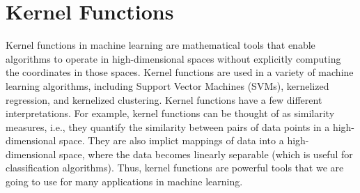 \documentclass{article}[11pt]
\newcommand{\norm}[1]{\left|\left|#1\right|\right|}
\begin{document}

\section{Kernel Functions}
Kernel functions in machine learning are mathematical tools that enable algorithms to operate in high-dimensional spaces without explicitly computing the coordinates in those spaces.
Kernel functions are used in a variety of machine learning algorithms, including Support Vector Machines (SVMs), kernelized regression, and kernelized clustering.
Kernel functions have a few different interpretations. 
For example, kernel functions can be thought of as similarity measures, i.e., they quantify the similarity between pairs of data points in a high-dimensional space.
They are also implict mappings of data into a high-dimensional space, where the data becomes linearly separable (which is useful for classification algorithms).
Thus, kernel functions are powerful tools that we are going to use for many applications in machine learning.
\end{document}
